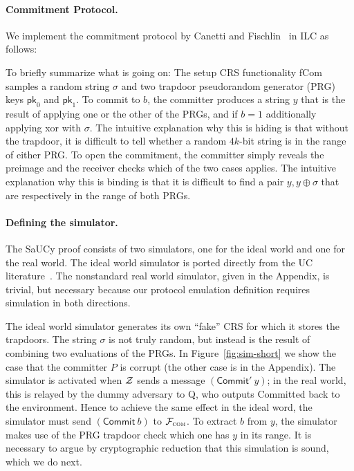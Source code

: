 \paragraph{Commitment Protocol.}
We implement the commitment protocol by Canetti and
Fischlin~\cite{canetti2001commitments} in ILC as follows:

To briefly summarize what is going on: The setup CRS functionality \textsf{fCom}
samples a random string $\sigma$ and two trapdoor pseudorandom generator (PRG) keys
$\mathsf{pk}_0$ and $\mathsf{pk}_1$.
To commit to $b$, the committer produces a string $y$ that is the result of applying one or the other of the PRGs, and if $b=1$ additionally applying xor with $\sigma$.
The intuitive explanation why this is hiding is that without the trapdoor, it is difficult to tell whether a random $4k$-bit string is in the range of either PRG. To open the commitment, the committer simply reveals the preimage and the receiver checks which of the two cases applies. The intuitive explanation why this is binding is that it is difficult to find a pair $y,y\oplus\sigma$ that are respectively in the range of both PRGs.

\paragraph{Defining the simulator.}
The SaUCy proof consists of two simulators, one for the ideal world and one for the real world.
The ideal world simulator is ported directly from the UC literature~\cite{canetti2001commitments}. The nonstandard real world simulator, given in the Appendix, is trivial, but necessary because our protocol emulation definition requires simulation in both directions.

The ideal world simulator generates its own ``fake'' CRS for which it stores the
trapdoors. The string $\sigma$ is not truly random, but instead is the result of
combining two evaluations of the PRGs. In Figure~\ref{fig:sim-short} we show the
case that the committer $P$ is corrupt (the other case is in the Appendix). The
simulator is activated when $\mathcal{{Z}}$ sends a message $(\mathsf{Commit}' ~ y)$;
in the real world, this is relayed by the dummy adversary to Q, who outputs
\textsf{Committed} back to the environment. Hence to achieve the same effect in
the ideal word, the simulator must send $(\mathsf{Commit}~b)$ to
$\mathcal{{F}}_{\textsc{com}}$. To extract $b$ from $y$, the simulator makes use of the
PRG trapdoor check which one has $y$ in its range.  It is necessary to argue by
cryptographic reduction that this simulation is sound, which we do next.

